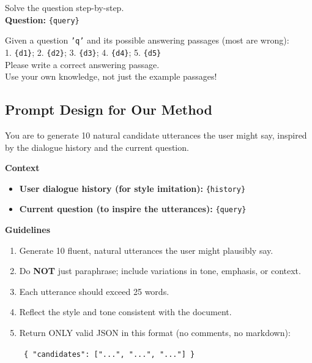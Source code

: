 \begin{tcolorbox}[colback=blue!5!white, colframe=blue!75!black, title=Chain-of-Thought Prompt]
Solve the question step-by-step.\\
\textbf{Question:} \texttt{\{query\}}
\end{tcolorbox}



\begin{tcolorbox}[colback=blue!5!white, colframe=blue!75!black, title=ThinkQE Prompt]
Given a question \texttt{'q'} and its possible answering passages (most are wrong):\\
1. \texttt{\{d1\}}; 2. \texttt{\{d2\}}; 3. \texttt{\{d3\}}; 4. \texttt{\{d4\}}; 5. \texttt{\{d5\}}\\
Please write a correct answering passage.\\
Use your own knowledge, not just the example passages!
\end{tcolorbox}


\subsection*{Prompt Design for Our Method}


\begin{tcolorbox}[colback=blue!5!white, colframe=blue!75!black, title=P-PRF-roughly]
You are to generate 10 natural candidate utterances the user might say, inspired by the dialogue history and the current question.

\textbf{Context}
\begin{itemize}
    \item \textbf{User dialogue history (for style imitation):} \texttt{\{history\}}
    \item \textbf{Current question (to inspire the utterances):} \texttt{\{query\}}
\end{itemize}

\textbf{Guidelines}
\begin{enumerate}
    \item Generate 10 fluent, natural utterances the user might plausibly say.
    \item Do \textbf{NOT} just paraphrase; include variations in tone, emphasis, or context.
    \item Each utterance should exceed 25 words.
    \item Reflect the style and tone consistent with the document.
    \item Return ONLY valid JSON in this format (no comments, no markdown):
    
    \texttt{
    \{
    "candidates": ["...", "...", "..."]
    \}
    }
\end{enumerate}
\end{tcolorbox}

